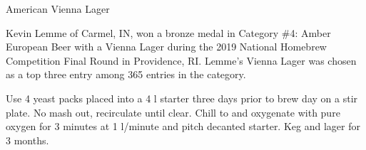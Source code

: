 \stylesection{\styleviennalager}

\begin{recipie}{American Vienna Lager}

\begin{aboutblock}
Kevin Lemme of Carmel, IN, won a bronze medal in Category \#4: Amber European Beer with
a Vienna Lager during the 2019 National Homebrew Competition Final Round in Providence,
RI. Lemme's Vienna Lager was chosen as a top three entry among 365 entries in the category.
\end{aboutblock}


\begin{methodandtiming}
 
\begin{mashsteps}
\end{mashsteps}

\begin{fermentationsteps}
\end{fermentationsteps}

\begin{directions}
Use 4 yeast packs placed into a 4 l starter three days prior to brew day on a stir plate.
No mash out, recirculate until clear. Chill to  and oxygenate with pure oxygen
for 3 minutes at 1 l/minute and pitch decanted starter. Keg and lager for 3 months.
\end{directions}

\end{methodandtiming}

\begin{ingredientsblock}

\begin{malts}
\end{malts}

\begin{hops}
\end{hops}


\end{ingredientsblock}
\end{recipie}
